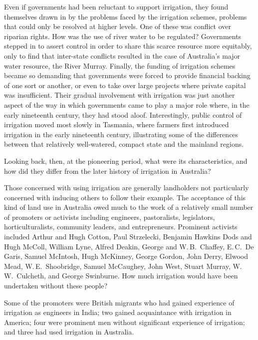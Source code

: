 Even if governments had been reluctant to support irrigation, they
found themselves drawn in by the problems faced by the irrigation
schemes, problems that could only be resolved at higher levels. One of
these was conflict over riparian rights.  How
was the use of river water to be regulated? Governments stepped in to
assert control in order to share this scarce resource more equitably,
only to find that inter-state conflicts resulted in the case of
Australia's major water resource, the River Murray. Finally, the
funding of irrigation schemes became so demanding that governments
were forced to provide financial backing of one sort or
another, or even to take over large projects where private capital was
insufficient. Their gradual involvement with irrigation was just
another aspect of the way in which governments came to play a major
role where, in the early nineteenth century, they had stood
aloof. Interestingly, public control of irrigation moved most slowly
in Tasmania,  where farmers first introduced
irrigation in the early nineteenth century, illustrating some of the
differences between that relatively well-watered, compact state and
the mainland regions.

Looking back, then, at the pioneering period, what were its
characteristics, and how did they differ from the later history of
irrigation in Australia?

\bigskip\noindent
Those concerned with using irrigation are generally landholders not
particularly concerned with inducing others to follow their
example. The acceptance of this kind of land use in Australia owed
much to the work of a relatively small number of promoters or
activists including engineers, pastoralists, legislators,
horticulturalists, community leaders, and entrepreneurs.  Prominent
activists included Arthur and Hugh Cotton, Paul Strzelecki, Benjamin
Hawkins Dods and Hugh McColl, William Lyne, Alfred Deakin, George and
W.\,B.~Chaffey, E.\,C.~De Garis, Samuel McIntosh, Hugh McKinney,
George Gordon, John Derry, Elwood Mead, W.\,E.~Shoobridge, Samuel
McCaughey, John West, Stuart Murray, W.\,W.~Culcheth, and George
Swinburne. How much irrigation would have been undertaken without
these people?

Some of the promoters were British migrants who had gained experience
of irrigation as engineers in India; two gained
acquaintance with irrigation in America; four were
prominent men without significant experience of irrigation; and three
had used irrigation in Australia.

